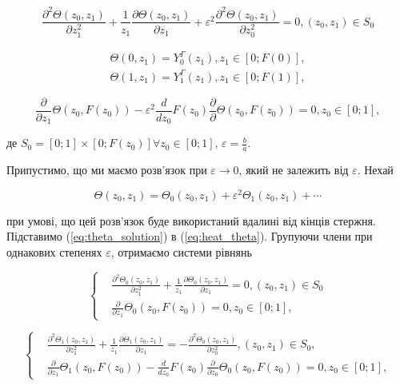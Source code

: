 \begin{equation}
\label{eq:heat_theta}
\frac{\partial^2\Theta(z_0, z_1)}{\partial z_1^2} + \frac{1}{z_1} \frac{\partial \Theta(z_0, z_1)}{\partial z_1} +
 \varepsilon^2\frac{\partial^2\Theta(z_0, z_1)}{\partial z_0^2} = 0, (z_0, z_1) \in S_0
\end{equation}

\begin{equation}
\begin{array}{c}
\Theta(0, z_1) = Y_0^\Gamma(z_1), z_1 \in [0; F(0)],  \\
\Theta(1, z_1) = Y_1^\Gamma(z_1), z_1 \in [0; F(1)],
\end{array}
\end{equation}

\begin{equation}
\frac{\partial}{\partial z_1} \Theta(z_0, F(z_0)) - \varepsilon^2 \frac{d}{dz_0} F(z_0) \frac{\partial}{\partial}
\Theta(z_0, F(z_0)) = 0, z_0 \in [0; 1],
\end{equation}

де $S_0 = [0; 1] \times [0; F(z_0)] \forall z_0 \in [0; 1]$, $ \varepsilon = \frac{b}{a}$.

Припустимо, що ми маємо розв’язок при $\varepsilon \to 0$, який не залежить від $\varepsilon$. Нехай

\begin{equation}
\label{eq:theta_solution}
\Theta(z_0, z_1) = \Theta_0(z_0, z_1) + \varepsilon^2\Theta_1(z_0,z_1) + \cdots
\end{equation}

при умові, що цей розв’язок буде використаний вдалині від кінців стержня. Підставимо (\ref{eq:theta_solution}) в
(\ref{eq:heat_theta}). Групуючи члени
при однакових степенях $\varepsilon$, отримаємо системи рівнянь

\begin{equation}
\left\{
\begin{alignedat}{2}
&\frac{\partial^2\Theta_0(z_0, z_1)}{\partial z_1^2} + \frac{1}{z_1} \frac{\partial \Theta_0(z_0, z_1)}{\partial z_1}  =  0,
(z_0, z_1) \in S_0 \\
&\frac{\partial}{\partial z_1} \Theta_0(z_0, F(z_0))  =  0, z_0 \in [0; 1],
\end{alignedat}
\right.
\end{equation}

\begin{equation}
\label{eq:theta_2nd_iter}
\left\{
\begin{alignedat}{2}
&\frac{\partial^2\Theta_1(z_0, z_1)}{\partial z_1^2} + \frac{1}{z_1} \frac{\partial\Theta_1(z_0, z_1)}{\partial z_1}  =
-\frac{\partial^2\Theta_0(z_0, z_1)}{\partial z_0^2}, (z_0, z_1) \in S_0, \\
&\frac{\partial}{\partial z_1}\Theta_1(z_0, F(z_0)) - \frac{d}{dz_0}F(z_0)\frac{\partial}{\partial z_0}
\Theta_0(z_0, F(z_0))  =  0, z_0 \in [0; 1],
\end{alignedat}
\right.
\end{equation}

